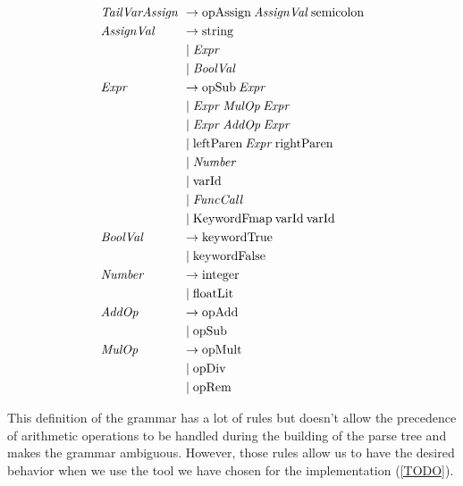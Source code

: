 \begin{align*}
    \omit $\mathit{TailVarAssign}$ \hfil & \rightarrow \text{opAssign} \: \mathit{AssignVal} \: \text{semicolon} \\
    \omit $\mathit{AssignVal}$ \hfil & \rightarrow \text{string} \\
    & \mid \mathit{Expr} \\
    & \mid \mathit{BoolVal}\\
    \omit $\mathit{Expr}$ \hfil & \rightarrow \text{opSub} \: \mathit{Expr} \\
    & \mid \mathit{Expr} \: \mathit{MulOp} \: \mathit{Expr} \\
    & \mid \mathit{Expr} \: \mathit{AddOp} \: \mathit{Expr} \\
    & \mid \text{leftParen}\: \mathit{Expr} \: \text{rightParen} \\
    & \mid \mathit{Number} \\
    & \mid \text{varId} \\
    & \mid \mathit{FuncCall} \\
    & \mid \text{KeywordFmap} \: \text{varId} \: \text{varId} \\
    \omit $\mathit{BoolVal}$ \hfil & \rightarrow \text{keywordTrue} \\
    & \mid \text{keywordFalse} \\
    \omit $\mathit{Number}$ \hfil & \rightarrow \text{integer} \\
    & \mid \text{floatLit} \\
    \omit $\mathit{AddOp}$ \hfil & \rightarrow \text{opAdd} \\
    & \mid \text{opSub} \\
    \omit $\mathit{MulOp}$ \hfil & \rightarrow \text{opMult} \\
    & \mid \text{opDiv} \\
    & \mid \text{opRem}
\end{align*}

This definition of the grammar has a lot of rules but doesn't allow the precedence of arithmetic operations to be handled during the building of the parse tree and makes the grammar ambiguous.
However, those rules allow us to have the desired behavior when we use the tool we have chosen for the implementation (\ref{TODO}).

